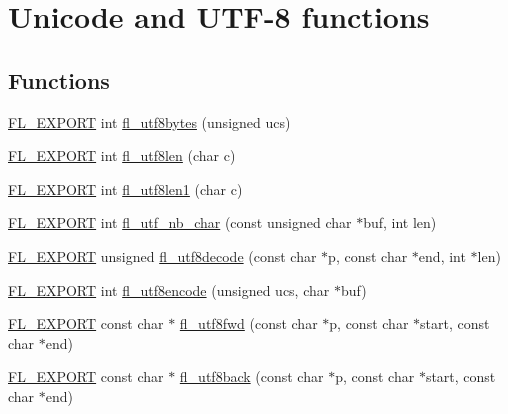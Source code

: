\hypertarget{group__fl__unicode}{}\section{Unicode and U\+T\+F-\/8 functions}
\label{group__fl__unicode}
\subsection*{Functions}
\begin{DoxyCompactItemize}
\item 
\hyperlink{_fl___export_8_h_aa9ba29a18aee9d738370a06eeb4470fc}{F\+L\+\_\+\+E\+X\+P\+O\+RT} int \hyperlink{group__fl__unicode_ga26bda752169d8e0a1f5ee3dfadb5e8d5}{fl\+\_\+utf8bytes} (unsigned ucs)
\item 
\hyperlink{_fl___export_8_h_aa9ba29a18aee9d738370a06eeb4470fc}{F\+L\+\_\+\+E\+X\+P\+O\+RT} int \hyperlink{group__fl__unicode_ga5d0c96f9df2770b22901588632af4a87}{fl\+\_\+utf8len} (char c)
\item 
\hyperlink{_fl___export_8_h_aa9ba29a18aee9d738370a06eeb4470fc}{F\+L\+\_\+\+E\+X\+P\+O\+RT} int \hyperlink{group__fl__unicode_ga9c883b726f48d2b72f83ce8f8c8dc14b}{fl\+\_\+utf8len1} (char c)
\item 
\hyperlink{_fl___export_8_h_aa9ba29a18aee9d738370a06eeb4470fc}{F\+L\+\_\+\+E\+X\+P\+O\+RT} int \hyperlink{group__fl__unicode_ga6ee2c4b4612eacf1ee4cdc3e5714c80a}{fl\+\_\+utf\+\_\+nb\+\_\+char} (const unsigned char $\ast$buf, int len)
\item 
\hyperlink{_fl___export_8_h_aa9ba29a18aee9d738370a06eeb4470fc}{F\+L\+\_\+\+E\+X\+P\+O\+RT} unsigned \hyperlink{group__fl__unicode_ga5ee17a469c66cfe3030e10af73132f71}{fl\+\_\+utf8decode} (const char $\ast$p, const char $\ast$end, int $\ast$len)
\item 
\hyperlink{_fl___export_8_h_aa9ba29a18aee9d738370a06eeb4470fc}{F\+L\+\_\+\+E\+X\+P\+O\+RT} int \hyperlink{group__fl__unicode_ga04b040e4adb278feddd1c32000da50a8}{fl\+\_\+utf8encode} (unsigned ucs, char $\ast$buf)
\item 
\hyperlink{_fl___export_8_h_aa9ba29a18aee9d738370a06eeb4470fc}{F\+L\+\_\+\+E\+X\+P\+O\+RT} const char $\ast$ \hyperlink{group__fl__unicode_ga4d7d32a8143c5b85afb4eb82093c2fb2}{fl\+\_\+utf8fwd} (const char $\ast$p, const char $\ast$start, const char $\ast$end)
\item 
\hyperlink{_fl___export_8_h_aa9ba29a18aee9d738370a06eeb4470fc}{F\+L\+\_\+\+E\+X\+P\+O\+RT} const char $\ast$ \hyperlink{group__fl__unicode_gab71dbdf24ad499fc8bbd5eb3bade6df6}{fl\+\_\+utf8back} (const char $\ast$p, const char $\ast$start, const char $\ast$end)

\end{DoxyCompactItemize}
